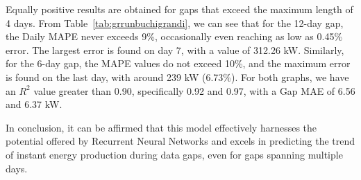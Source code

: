 Equally positive results are obtained for gaps that exceed the
maximum length of 4 days.
From Table~\ref{tab:grrunbuchigrandi}, we can see that for the
12-day gap, the Daily MAPE never exceeds 9\%, occasionally even reaching as low as 0.45\% error. The largest error is found on day 7, with a value of 312.26 kW.
Similarly, for the 6-day gap, the MAPE values do not exceed 10\%,
and the maximum error is found on the last day, with around
239 kW (6.73\%).
For both graphs, we have an $R^2$ value greater than 0.90, specifically 0.92 and 0.97, with a Gap MAE of 6.56 and 6.37 kW.

In conclusion, it can be affirmed that this model effectively
harnesses the potential offered by Recurrent Neural Networks and
excels in predicting the trend of instant energy production
during data gaps, even for gaps spanning multiple days.

